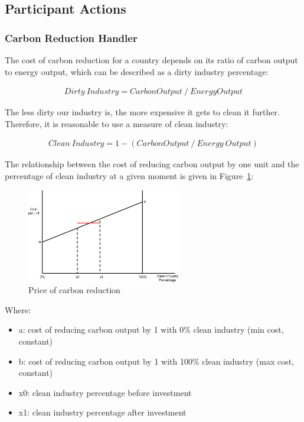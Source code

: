 
%
%

\subsection{Participant Actions}

\subsubsection{Carbon Reduction Handler}

The cost of carbon reduction for a country depends on its ratio of carbon output to energy output, which can be described as a dirty industry percentage:

\begin{align*}
Dirty~Industry = Carbon Output~/~Energy Output
\end{align*}

The less dirty our industry is, the more expensive it gets to clean it further. Therefore, it is reasonable to use a measure of clean industry:

\begin{align*}
Clean~Industry = 1 - (Carbon Output~/~Energy~Output)
\end{align*}
 
The relationship between the cost of reducing carbon output by one unit and the percentage of 
clean industry at a given moment is given in Figure~\ref{fig:carbon_reduction}:

\begin{figure}[h!]
	\centering
	\includegraphics[width=0.6\textwidth]{img/carbon-reduction.png}
	\caption{Price of carbon reduction}
	\label{fig:carbon_reduction}
\end{figure}

Where:
\begin{itemize}
	\item a: cost of reducing carbon output by 1 with 0\% clean industry (min cost, constant)
	\item b: cost of reducing carbon output by 1 with 100\% clean industry (max cost, constant)
	\item x0: clean industry percentage before investment
	\item x1: clean industry percentage after investment
\end{itemize}

